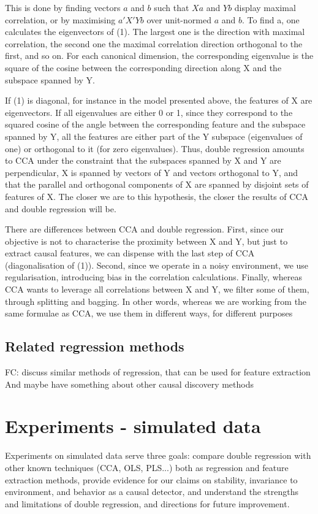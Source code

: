 \documentclass{article}
\begin{document}
This is done by finding vectors $a$ and $b$ such that $Xa$ and $Yb$ display maximal correlation, or by maximising $a'X'Yb$ over unit-normed $a$ and $b$. To find a, one calculates the eigenvectors of (1). The largest one is the direction with maximal correlation, the second one the maximal correlation direction orthogonal to the first, and so on. For each canonical dimension, the corresponding eigenvalue is the square of the cosine between the corresponding direction along X and the subspace spanned by Y.  

If (1) is diagonal, for instance in the model presented above, the features of X are eigenvectors. If all eigenvalues are either 0 or 1, since they correspond to the squared cosine of the angle between the corresponding feature and the subspace spanned by Y, all the features are either part of the Y subspace (eigenvalues of one) or orthogonal to it (for zero eigenvalues). Thus, double regression amounts to CCA under the constraint that the subspaces spanned by X and Y are perpendicular, X is spanned by vectors of Y and vectors orthogonal to Y, and that the parallel and orthogonal components of X are spanned by disjoint sets of features of X. The closer we are to this hypothesis, the closer the results of CCA and double regression will be.

There are differences between CCA and double regression. First, since our objective is not to characterise the proximity between X and Y, but just to extract causal features, we can dispense with the last step of CCA (diagonalisation of (1)). Second, since we operate in a noisy environment, we use regularisation, introducing bias in the correlation calculations. Finally, whereas CCA wants to leverage all correlations between X and Y, we filter some of them, through splitting and bagging. In other words, whereas we are working from the same formulae as CCA, we use them in different ways, for different purposes
  

\subsection{Related regression methods}
FC: discuss similar methods of regression, that can be used for feature extraction
And maybe have something about other causal discovery methods


\section{Experiments - simulated data}
Experiments on simulated data serve three goals: compare double regression with other known techniques (CCA, OLS, PLS...) both as regression and feature extraction methods, provide evidence for our claims on stability, invariance to environment, and behavior as a causal detector, and understand the strengths and limitations of double regression, and directions for future improvement.
\end{document}
